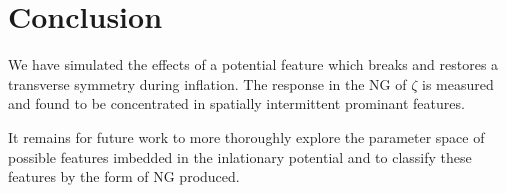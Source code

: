 
\section{Conclusion} \label{sec:conclusion}
We have simulated the effects of a potential feature which breaks and restores a transverse symmetry during inflation. 
The response in the NG of $\zeta$ is measured and found to be concentrated in spatially intermittent prominant features.

It remains for future work to more thoroughly explore the parameter space of possible features imbedded in the inlationary potential and to classify these features by the form of NG produced.

